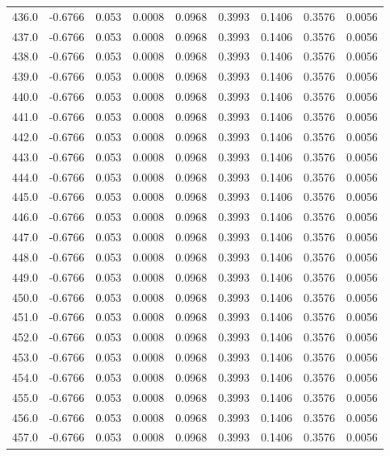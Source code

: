 \begin{longtable}{lrrrrrrrr}
436.0 & -0.6766 & 0.053 & 0.0008 & 0.0968 & 0.3993 & 0.1406 & 0.3576 & 0.0056 \\
437.0 & -0.6766 & 0.053 & 0.0008 & 0.0968 & 0.3993 & 0.1406 & 0.3576 & 0.0056 \\
438.0 & -0.6766 & 0.053 & 0.0008 & 0.0968 & 0.3993 & 0.1406 & 0.3576 & 0.0056 \\
439.0 & -0.6766 & 0.053 & 0.0008 & 0.0968 & 0.3993 & 0.1406 & 0.3576 & 0.0056 \\
440.0 & -0.6766 & 0.053 & 0.0008 & 0.0968 & 0.3993 & 0.1406 & 0.3576 & 0.0056 \\
441.0 & -0.6766 & 0.053 & 0.0008 & 0.0968 & 0.3993 & 0.1406 & 0.3576 & 0.0056 \\
442.0 & -0.6766 & 0.053 & 0.0008 & 0.0968 & 0.3993 & 0.1406 & 0.3576 & 0.0056 \\
443.0 & -0.6766 & 0.053 & 0.0008 & 0.0968 & 0.3993 & 0.1406 & 0.3576 & 0.0056 \\
444.0 & -0.6766 & 0.053 & 0.0008 & 0.0968 & 0.3993 & 0.1406 & 0.3576 & 0.0056 \\
445.0 & -0.6766 & 0.053 & 0.0008 & 0.0968 & 0.3993 & 0.1406 & 0.3576 & 0.0056 \\
446.0 & -0.6766 & 0.053 & 0.0008 & 0.0968 & 0.3993 & 0.1406 & 0.3576 & 0.0056 \\
447.0 & -0.6766 & 0.053 & 0.0008 & 0.0968 & 0.3993 & 0.1406 & 0.3576 & 0.0056 \\
448.0 & -0.6766 & 0.053 & 0.0008 & 0.0968 & 0.3993 & 0.1406 & 0.3576 & 0.0056 \\
449.0 & -0.6766 & 0.053 & 0.0008 & 0.0968 & 0.3993 & 0.1406 & 0.3576 & 0.0056 \\
450.0 & -0.6766 & 0.053 & 0.0008 & 0.0968 & 0.3993 & 0.1406 & 0.3576 & 0.0056 \\
451.0 & -0.6766 & 0.053 & 0.0008 & 0.0968 & 0.3993 & 0.1406 & 0.3576 & 0.0056 \\
452.0 & -0.6766 & 0.053 & 0.0008 & 0.0968 & 0.3993 & 0.1406 & 0.3576 & 0.0056 \\
453.0 & -0.6766 & 0.053 & 0.0008 & 0.0968 & 0.3993 & 0.1406 & 0.3576 & 0.0056 \\
454.0 & -0.6766 & 0.053 & 0.0008 & 0.0968 & 0.3993 & 0.1406 & 0.3576 & 0.0056 \\
455.0 & -0.6766 & 0.053 & 0.0008 & 0.0968 & 0.3993 & 0.1406 & 0.3576 & 0.0056 \\
456.0 & -0.6766 & 0.053 & 0.0008 & 0.0968 & 0.3993 & 0.1406 & 0.3576 & 0.0056 \\
457.0 & -0.6766 & 0.053 & 0.0008 & 0.0968 & 0.3993 & 0.1406 & 0.3576 & 0.0056 \\

\end{longtable}

